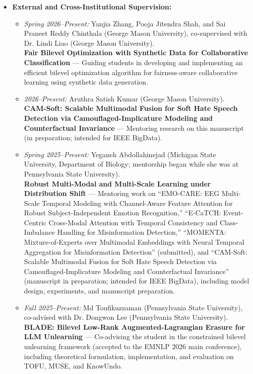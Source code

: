 \documentclass[letterpaper,11pt]{article}
\begin{document}
\begin{itemize}
    \item \textbf{External and Cross-Institutional Supervision:}
        \begin{itemize}
            \item \textit{Spring 2026--Present:} Yanjia Zhang, Pooja Jitendra Shah, and Sai Praneet Reddy Chinthala (George Mason University), co-supervised with Dr. Lindi Liao (George Mason University). \\
                \textbf{Fair Bilevel Optimization with Synthetic Data for Collaborative Classification} --- Guiding students in developing and implementing an efficient bilevel optimization algorithm for fairness-aware collaborative learning using synthetic data generation.

            \item \textit{2026--Present:} Aruthra Satish Kumar (George Mason University). \\
                \textbf{CAM-Soft: Scalable Multimodal Fusion for Soft Hate Speech Detection via Camouflaged-Implicature Modeling and Counterfactual Invariance} --- Mentoring research on this manuscript (in preparation; intended for IEEE BigData).

            \item \textit{Spring 2025--Present:} Yeganeh Abdollahinejad (Michigan State University, Department of Biology; mentorship began while she was at Pennsylvania State University). \\
                \textbf{Robust Multi-Modal and Multi-Scale Learning under Distribution Shift} --- Mentoring work on ``EMO-CARE: EEG Multi-Scale Temporal Modeling with Channel-Aware Feature Attention for Robust Subject-Independent Emotion Recognition,'' ``E-CaTCH: Event-Centric Cross-Modal Attention with Temporal Consistency and Class-Imbalance Handling for Misinformation Detection,'' ``MOMENTA: Mixture-of-Experts over Multimodal Embeddings with Neural Temporal Aggregation for Misinformation Detection'' (submitted), and ``CAM-Soft: Scalable Multimodal Fusion for Soft Hate Speech Detection via Camouflaged-Implicature Modeling and Counterfactual Invariance'' (manuscript in preparation; intended for IEEE BigData), including model design, experiments, and manuscript preparation.

            \item \textit{Fall 2025--Present:} Md Toufikuzzaman (Pennsylvania State University), co-advised with Dr. Dongwon Lee (Pennsylvania State University). \\
                \textbf{BLADE: Bilevel Low-Rank Augmented-Lagrangian Erasure for LLM Unlearning} --- Co-advising the student in the constrained bilevel unlearning framework (accepted to the EMNLP 2026 main conference), including theoretical formulation, implementation, and evaluation on TOFU, MUSE, and KnowUndo.


\end{itemize}
\end{itemize}
\end{document}
